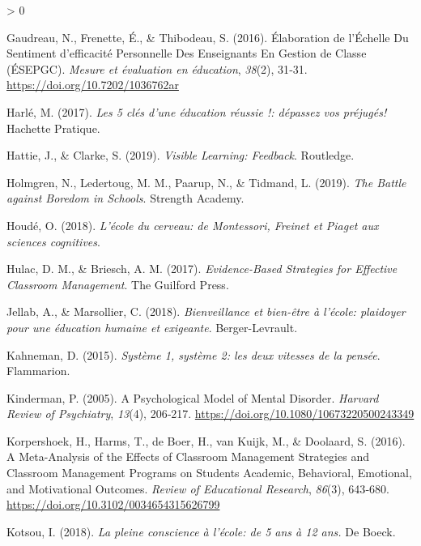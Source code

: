 \documentclass[
  french,
]{article}
\newlength{\cslhangindent}
\newenvironment{CSLReferences}[2] %
 {%
  \setlength{\parindent}{0pt}
  \ifodd #1 \everypar{\setlength{\hangindent}{\cslhangindent}}\ignorespaces\fi
  \ifnum #2 > 0
  \setlength{\parskip}{#2\baselineskip}
  \fi
 }%
 {}
\begin{document}
\begin{CSLReferences}{1}{0}
\leavevmode\hypertarget{ref-gaudreau2016}{}%
Gaudreau, N., Frenette, É., \& Thibodeau, S. (2016). Élaboration de l'{Échelle} Du Sentiment d'efficacité Personnelle Des Enseignants En Gestion de Classe ({ÉSEPGC}). \emph{Mesure et évaluation en éducation}, \emph{38}(2), 31‑31. \url{https://doi.org/10.7202/1036762ar}

\leavevmode\hypertarget{ref-harle2017}{}%
Harlé, M. (2017). \emph{{Les 5 clés d'une éducation réussie !: dépassez vos préjugés!}} {Hachette Pratique}.

\leavevmode\hypertarget{ref-hattie2019}{}%
Hattie, J., \& Clarke, S. (2019). \emph{Visible Learning: Feedback}. {Routledge}.

\leavevmode\hypertarget{ref-holmgren2019}{}%
Holmgren, N., Ledertoug, M. M., Paarup, N., \& Tidmand, L. (2019). \emph{The {Battle} against {Boredom} in Schools}. {Strength Academy}.

\leavevmode\hypertarget{ref-houde2018a}{}%
Houdé, O. (2018). \emph{{L'école du cerveau: de Montessori, Freinet et Piaget aux sciences cognitives}}.

\leavevmode\hypertarget{ref-hulac2017a}{}%
Hulac, D. M., \& Briesch, A. M. (2017). \emph{Evidence-Based Strategies for Effective Classroom Management}. {The Guilford Press}.

\leavevmode\hypertarget{ref-jellab2018}{}%
Jellab, A., \& Marsollier, C. (2018). \emph{{Bienveillance et bien-être à l'école: plaidoyer pour une éducation humaine et exigeante}}. {Berger-Levrault}.

\leavevmode\hypertarget{ref-kahneman2015}{}%
Kahneman, D. (2015). \emph{{Système 1, système 2: les deux vitesses de la pensée}}. {Flammarion}.

\leavevmode\hypertarget{ref-kinderman2005}{}%
Kinderman, P. (2005). A Psychological Model of Mental Disorder. \emph{Harvard Review of Psychiatry}, \emph{13}(4), 206‑217. \url{https://doi.org/10.1080/10673220500243349}

\leavevmode\hypertarget{ref-korpershoek2016}{}%
Korpershoek, H., Harms, T., de Boer, H., van Kuijk, M., \& Doolaard, S. (2016). A {Meta}-{Analysis} of the {Effects} of {Classroom Management Strategies} and {Classroom Management Programs} on {Students Academic}, {Behavioral}, {Emotional}, and {Motivational Outcomes}. \emph{Review of Educational Research}, \emph{86}(3), 643‑680. \url{https://doi.org/10.3102/0034654315626799}

\leavevmode\hypertarget{ref-kotsou2018}{}%
Kotsou, I. (2018). \emph{{La pleine conscience à l'école: de 5 ans à 12 ans.}} {De Boeck}.


\end{CSLReferences}
\end{document}
